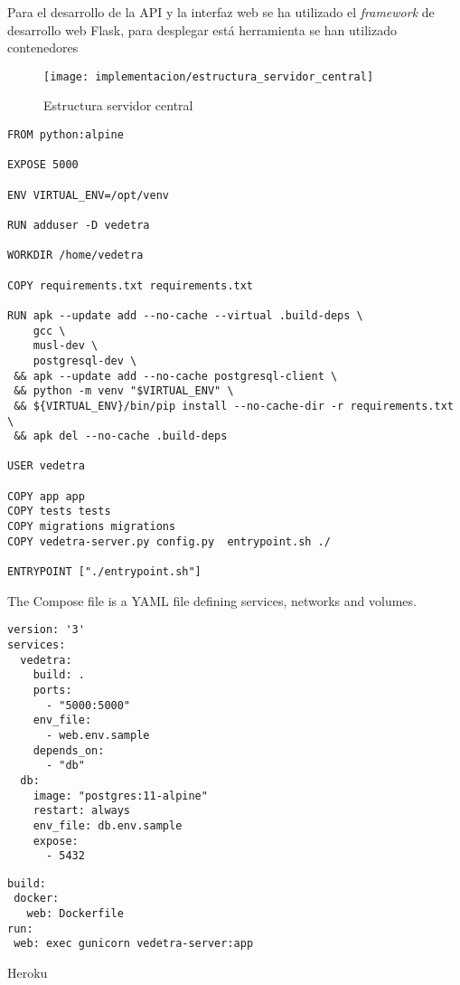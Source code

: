 \documentclass[../proyecto.tex]{subfiles}
\begin{document}
Para el desarrollo de la API y la interfaz web se ha utilizado el \textit{framework} de desarrollo web Flask, para desplegar está herramienta se han utilizado contenedores

\begin{figure}[H]
\centering
\texttt{[image: implementacion/estructura\_servidor\_central]}
\caption{Estructura servidor central }
\label{fig:estructura_servidor_central}
\end{figure}


\begin{minipage}{\linewidth}
\begin{lstlisting}[caption=Dockerfile del servidor web, captionpos=b, frame=single]
FROM python:alpine

EXPOSE 5000

ENV VIRTUAL_ENV=/opt/venv

RUN adduser -D vedetra

WORKDIR /home/vedetra

COPY requirements.txt requirements.txt

RUN apk --update add --no-cache --virtual .build-deps \
    gcc \
    musl-dev \
    postgresql-dev \
 && apk --update add --no-cache postgresql-client \
 && python -m venv "$VIRTUAL_ENV" \
 && ${VIRTUAL_ENV}/bin/pip install --no-cache-dir -r requirements.txt \
 && apk del --no-cache .build-deps

USER vedetra

COPY app app
COPY tests tests
COPY migrations migrations
COPY vedetra-server.py config.py  entrypoint.sh ./

ENTRYPOINT ["./entrypoint.sh"]
\end{lstlisting}
\end{minipage}

The Compose file is a YAML file defining services, networks and volumes.

\begin{minipage}{\linewidth}
\begin{lstlisting}[caption=Descripción Docker Compose, captionpos=b, frame=single]
version: '3'
services:
  vedetra:
    build: .
    ports:
      - "5000:5000"
    env_file:
      - web.env.sample
    depends_on:
      - "db"
  db:
    image: "postgres:11-alpine"
    restart: always
    env_file: db.env.sample
    expose:
      - 5432
\end{lstlisting}
\end{minipage}

\begin{minipage}{\linewidth}
\begin{lstlisting}[caption=Definición de aplicación de Heroku, captionpos=b, frame=single]
build:
 docker:
   web: Dockerfile
run:
 web: exec gunicorn vedetra-server:app
\end{lstlisting}
\end{minipage}

Heroku
\end{document}
